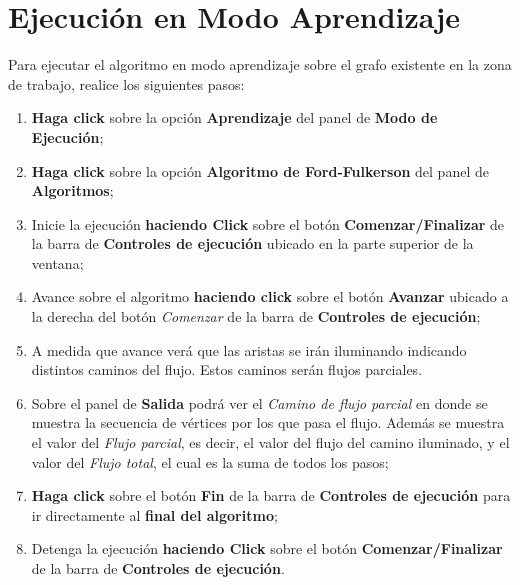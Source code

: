 \documentclass{book}
\begin{document}
\section{Ejecución en Modo Aprendizaje}

Para ejecutar el algoritmo en modo aprendizaje sobre el grafo existente en la zona de trabajo, realice los siguientes pasos:
\medskip

\begin{enumerate}
	\itemsep=8pt \topsep=0pt \partopsep=0pt \parskip=0pt \parsep=0pt

	\item \textbf{Haga click} sobre la opción \textbf{Aprendizaje} del panel de \textbf{Modo de Ejecución};

	\item \textbf{Haga click} sobre la opción \textbf{Algoritmo de Ford-Fulkerson} del panel de \textbf{Algoritmos};

	\item Inicie la ejecución \textbf{haciendo Click} sobre el botón \textbf{Comenzar/Finalizar} de la barra de \textbf{Controles de ejecución} ubicado en la parte superior de la ventana;

	\item Avance sobre el algoritmo \textbf{haciendo click} sobre el botón \textbf{Avanzar} ubicado a la derecha del botón \textit{Comenzar} de la barra de \textbf{Controles de ejecución};

	\item A medida que avance verá que las aristas se irán iluminando indicando distintos caminos del flujo. Estos caminos serán flujos parciales.

	\item Sobre el panel de \textbf{Salida} podrá ver el \textit{Camino de flujo parcial} en donde se muestra la secuencia de vértices por los que pasa el flujo. Además se muestra el valor del \textit{Flujo parcial}, es decir, el valor del flujo del camino iluminado, y el valor del \textit{Flujo total}, el cual es la suma de todos los pasos;

	\item \textbf{Haga click} sobre el botón \textbf{Fin} de la barra de \textbf{Controles de ejecución} para ir directamente al \textbf{final del algoritmo};

	\item Detenga la ejecución \textbf{haciendo Click} sobre el botón \textbf{Comenzar/Finalizar} de la barra de \textbf{Controles de ejecución}.

\end{enumerate}
\medskip
\end{document}
